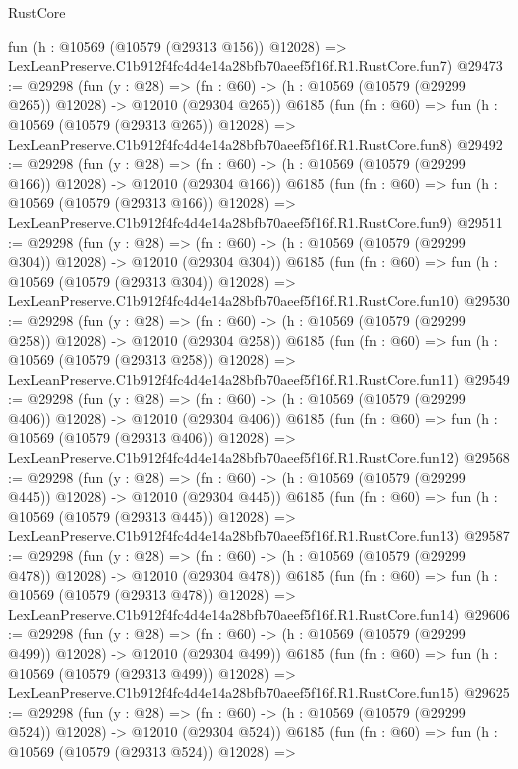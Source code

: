 \begin{lexlean}{RustCore}
\begin{coremodule}
    fun (h : @10569 (@10579 (@29313 @156)) @12028) =>
    LexLeanPreserve.C1b912f4fc4d4e14a28bfb70aeef5f16f.R1.RustCore.fun7)
@29473 := @29298
    (fun (y : @28) =>
    (fn : @60) -> (h : @10569 (@10579 (@29299 @265)) @12028) -> @12010 (@29304 @265))
    @6185
    (fun (fn : @60) =>
    fun (h : @10569 (@10579 (@29313 @265)) @12028) =>
    LexLeanPreserve.C1b912f4fc4d4e14a28bfb70aeef5f16f.R1.RustCore.fun8)
@29492 := @29298
    (fun (y : @28) =>
    (fn : @60) -> (h : @10569 (@10579 (@29299 @166)) @12028) -> @12010 (@29304 @166))
    @6185
    (fun (fn : @60) =>
    fun (h : @10569 (@10579 (@29313 @166)) @12028) =>
    LexLeanPreserve.C1b912f4fc4d4e14a28bfb70aeef5f16f.R1.RustCore.fun9)
@29511 := @29298
    (fun (y : @28) =>
    (fn : @60) -> (h : @10569 (@10579 (@29299 @304)) @12028) -> @12010 (@29304 @304))
    @6185
    (fun (fn : @60) =>
    fun (h : @10569 (@10579 (@29313 @304)) @12028) =>
    LexLeanPreserve.C1b912f4fc4d4e14a28bfb70aeef5f16f.R1.RustCore.fun10)
@29530 := @29298
    (fun (y : @28) =>
    (fn : @60) -> (h : @10569 (@10579 (@29299 @258)) @12028) -> @12010 (@29304 @258))
    @6185
    (fun (fn : @60) =>
    fun (h : @10569 (@10579 (@29313 @258)) @12028) =>
    LexLeanPreserve.C1b912f4fc4d4e14a28bfb70aeef5f16f.R1.RustCore.fun11)
@29549 := @29298
    (fun (y : @28) =>
    (fn : @60) -> (h : @10569 (@10579 (@29299 @406)) @12028) -> @12010 (@29304 @406))
    @6185
    (fun (fn : @60) =>
    fun (h : @10569 (@10579 (@29313 @406)) @12028) =>
    LexLeanPreserve.C1b912f4fc4d4e14a28bfb70aeef5f16f.R1.RustCore.fun12)
@29568 := @29298
    (fun (y : @28) =>
    (fn : @60) -> (h : @10569 (@10579 (@29299 @445)) @12028) -> @12010 (@29304 @445))
    @6185
    (fun (fn : @60) =>
    fun (h : @10569 (@10579 (@29313 @445)) @12028) =>
    LexLeanPreserve.C1b912f4fc4d4e14a28bfb70aeef5f16f.R1.RustCore.fun13)
@29587 := @29298
    (fun (y : @28) =>
    (fn : @60) -> (h : @10569 (@10579 (@29299 @478)) @12028) -> @12010 (@29304 @478))
    @6185
    (fun (fn : @60) =>
    fun (h : @10569 (@10579 (@29313 @478)) @12028) =>
    LexLeanPreserve.C1b912f4fc4d4e14a28bfb70aeef5f16f.R1.RustCore.fun14)
@29606 := @29298
    (fun (y : @28) =>
    (fn : @60) -> (h : @10569 (@10579 (@29299 @499)) @12028) -> @12010 (@29304 @499))
    @6185
    (fun (fn : @60) =>
    fun (h : @10569 (@10579 (@29313 @499)) @12028) =>
    LexLeanPreserve.C1b912f4fc4d4e14a28bfb70aeef5f16f.R1.RustCore.fun15)
@29625 := @29298
    (fun (y : @28) =>
    (fn : @60) -> (h : @10569 (@10579 (@29299 @524)) @12028) -> @12010 (@29304 @524))
    @6185
    (fun (fn : @60) =>
    fun (h : @10569 (@10579 (@29313 @524)) @12028) =>

\end{coremodule}
\end{lexlean}
